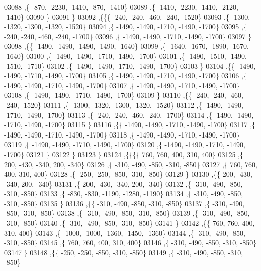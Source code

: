 \begin{DoxyCode}
03088     ,\{  -870, -2230, -1410,  -870, -1410\}
03089     ,\{ -1410, -2230, -1410, -2120, -1410\}
03090     \}
03091    \}
03092   ,\{\{\{  -240,  -240,  -460,  -240, -1520\}
03093     ,\{ -1300, -1320, -1300, -1320, -1520\}
03094     ,\{ -1490, -1490, -1710, -1490, -1700\}
03095     ,\{  -240,  -240,  -460,  -240, -1700\}
03096     ,\{ -1490, -1490, -1710, -1490, -1700\}
03097     \}
03098    ,\{\{ -1490, -1490, -1490, -1490, -1640\}
03099     ,\{ -1640, -1670, -1890, -1670, -1640\}
03100     ,\{ -1490, -1490, -1710, -1490, -1700\}
03101     ,\{ -1490, -1510, -1490, -1510, -1710\}
03102     ,\{ -1490, -1490, -1710, -1490, -1700\}
03103     \}
03104    ,\{\{ -1490, -1490, -1710, -1490, -1700\}
03105     ,\{ -1490, -1490, -1710, -1490, -1700\}
03106     ,\{ -1490, -1490, -1710, -1490, -1700\}
03107     ,\{ -1490, -1490, -1710, -1490, -1700\}
03108     ,\{ -1490, -1490, -1710, -1490, -1700\}
03109     \}
03110    ,\{\{  -240,  -240,  -460,  -240, -1520\}
03111     ,\{ -1300, -1320, -1300, -1320, -1520\}
03112     ,\{ -1490, -1490, -1710, -1490, -1700\}
03113     ,\{  -240,  -240,  -460,  -240, -1700\}
03114     ,\{ -1490, -1490, -1710, -1490, -1700\}
03115     \}
03116    ,\{\{ -1490, -1490, -1710, -1490, -1700\}
03117     ,\{ -1490, -1490, -1710, -1490, -1700\}
03118     ,\{ -1490, -1490, -1710, -1490, -1700\}
03119     ,\{ -1490, -1490, -1710, -1490, -1700\}
03120     ,\{ -1490, -1490, -1710, -1490, -1700\}
03121     \}
03122    \}
03123   \}
03124  ,\{\{\{\{   760,   760,   400,   310,   400\}
03125     ,\{   200,  -430,  -340,   200,  -340\}
03126     ,\{  -310,  -490,  -850,  -310,  -850\}
03127     ,\{   760,   760,   400,   310,   400\}
03128     ,\{  -250,  -250,  -850,  -310,  -850\}
03129     \}
03130    ,\{\{   200,  -430,  -340,   200,  -340\}
03131     ,\{   200,  -430,  -340,   200,  -340\}
03132     ,\{  -310,  -490,  -850,  -310,  -850\}
03133     ,\{  -830,  -830, -1190, -1280, -1190\}
03134     ,\{  -310,  -490,  -850,  -310,  -850\}
03135     \}
03136    ,\{\{  -310,  -490,  -850,  -310,  -850\}
03137     ,\{  -310,  -490,  -850,  -310,  -850\}
03138     ,\{  -310,  -490,  -850,  -310,  -850\}
03139     ,\{  -310,  -490,  -850,  -310,  -850\}
03140     ,\{  -310,  -490,  -850,  -310,  -850\}
03141     \}
03142    ,\{\{   760,   760,   400,   310,   400\}
03143     ,\{ -1000, -1000, -1360, -1450, -1360\}
03144     ,\{  -310,  -490,  -850,  -310,  -850\}
03145     ,\{   760,   760,   400,   310,   400\}
03146     ,\{  -310,  -490,  -850,  -310,  -850\}
03147     \}
03148    ,\{\{  -250,  -250,  -850,  -310,  -850\}
03149     ,\{  -310,  -490,  -850,  -310,  -850\}

\end{DoxyCode}
